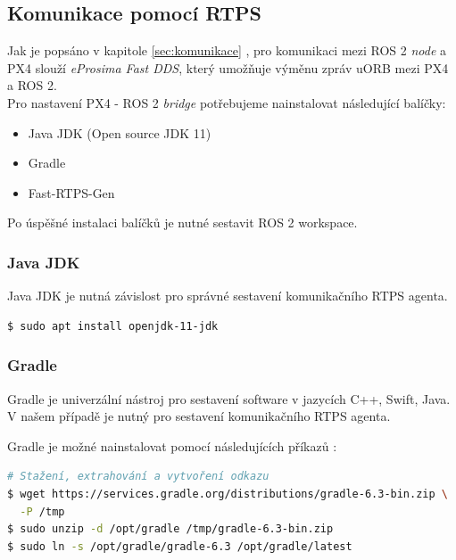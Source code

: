 \subsection{Komunikace pomocí \acs{RTPS}}

Jak je popsáno v kapitole \ref{sec:komunikace} , pro komunikaci mezi ROS 2 \textit{node} a PX4 slouží \textit{eProsima Fast DDS}, který umožňuje výměnu zpráv uORB mezi PX4 a ROS 2.\\

Pro nastavení PX4 - ROS 2 \textit{bridge} potřebujeme nainstalovat následující balíčky:

\begin{itemize}
    \item Java JDK (Open source JDK 11)
    \item Gradle
    \item Fast-RTPS-Gen\\
\end{itemize}

Po úspěšné instalaci  balíčků je nutné sestavit ROS 2 workspace.

\subsubsection{Java JDK}

Java JDK je nutná závislost pro správné sestavení komunikačního RTPS agenta.

\begin{lstlisting}[language=bash]
$ sudo apt install openjdk-11-jdk
\end{lstlisting}

\subsubsection{Gradle}

Gradle je univerzální nástroj pro sestavení software v jazycích C++, Swift, Java. V našem případě je nutný pro sestavení komunikačního \acs{RTPS} agenta.

Gradle je možné nainstalovat pomocí následujících příkazů \cite{GRADLE}:

\begin{lstlisting}[language=bash]
# Stažení, extrahování a vytvoření odkazu
$ wget https://services.gradle.org/distributions/gradle-6.3-bin.zip \
  -P /tmp
$ sudo unzip -d /opt/gradle /tmp/gradle-6.3-bin.zip
$ sudo ln -s /opt/gradle/gradle-6.3 /opt/gradle/latest
\end{lstlisting}

